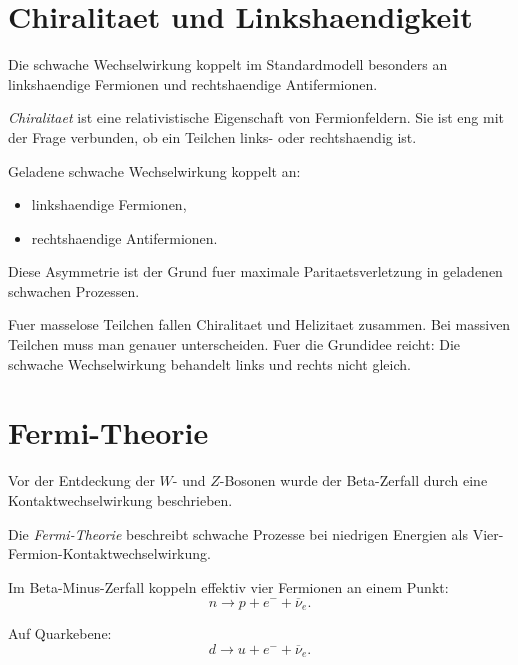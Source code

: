 \section{Chiralitaet und Linkshaendigkeit}

Die schwache Wechselwirkung koppelt im Standardmodell besonders an linkshaendige
Fermionen und rechtshaendige Antifermionen.

\begin{definitionbox}
\emph{Chiralitaet} ist eine relativistische Eigenschaft von Fermionfeldern.
Sie ist eng mit der Frage verbunden, ob ein Teilchen links- oder rechtshaendig ist.
\end{definitionbox}

\begin{conceptbox}
Geladene schwache Wechselwirkung koppelt an:
\begin{itemize}
    \item linkshaendige Fermionen,
    \item rechtshaendige Antifermionen.
\end{itemize}

Diese Asymmetrie ist der Grund fuer maximale Paritaetsverletzung in geladenen
schwachen Prozessen.
\end{conceptbox}

\begin{notebox}
Fuer masselose Teilchen fallen Chiralitaet und Helizitaet zusammen.
Bei massiven Teilchen muss man genauer unterscheiden.
Fuer die Grundidee reicht:
Die schwache Wechselwirkung behandelt links und rechts nicht gleich.
\end{notebox}

\section{Fermi-Theorie}

Vor der Entdeckung der $W$- und $Z$-Bosonen wurde der Beta-Zerfall durch eine
Kontaktwechselwirkung beschrieben.

\begin{definitionbox}
Die \emph{Fermi-Theorie} beschreibt schwache Prozesse bei niedrigen Energien als
Vier-Fermion-Kontaktwechselwirkung.
\end{definitionbox}

\begin{conceptbox}
Im Beta-Minus-Zerfall koppeln effektiv vier Fermionen an einem Punkt:
\[
    n \rightarrow p+e^-+\overline{\nu}_e.
\]

Auf Quarkebene:
\[
    d \rightarrow u+e^-+\overline{\nu}_e.
\]
\end{conceptbox}

